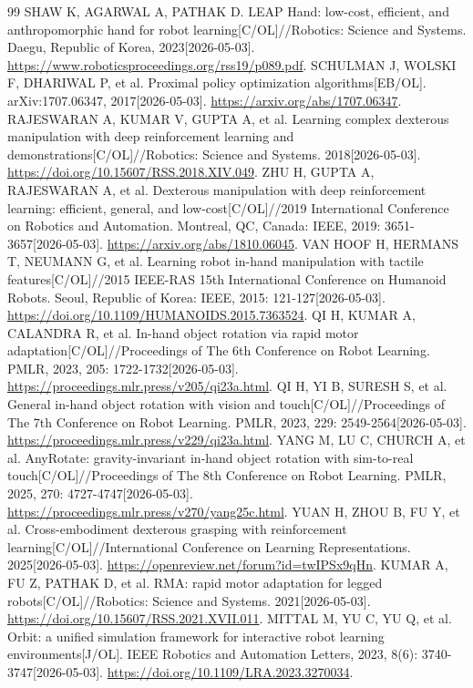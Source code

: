 \begin{thebibliography}{99}
 SHAW K, AGARWAL A, PATHAK D. LEAP Hand: low-cost, efficient, and anthropomorphic hand for robot learning[C/OL]//Robotics: Science and Systems. Daegu, Republic of Korea, 2023[2026-05-03]. \url{https://www.roboticsproceedings.org/rss19/p089.pdf}.
 SCHULMAN J, WOLSKI F, DHARIWAL P, et al. Proximal policy optimization algorithms[EB/OL]. arXiv:1707.06347, 2017[2026-05-03]. \url{https://arxiv.org/abs/1707.06347}.
 RAJESWARAN A, KUMAR V, GUPTA A, et al. Learning complex dexterous manipulation with deep reinforcement learning and demonstrations[C/OL]//Robotics: Science and Systems. 2018[2026-05-03]. \url{https://doi.org/10.15607/RSS.2018.XIV.049}.
 ZHU H, GUPTA A, RAJESWARAN A, et al. Dexterous manipulation with deep reinforcement learning: efficient, general, and low-cost[C/OL]//2019 International Conference on Robotics and Automation. Montreal, QC, Canada: IEEE, 2019: 3651-3657[2026-05-03]. \url{https://arxiv.org/abs/1810.06045}.
 VAN HOOF H, HERMANS T, NEUMANN G, et al. Learning robot in-hand manipulation with tactile features[C/OL]//2015 IEEE-RAS 15th International Conference on Humanoid Robots. Seoul, Republic of Korea: IEEE, 2015: 121-127[2026-05-03]. \url{https://doi.org/10.1109/HUMANOIDS.2015.7363524}.
 QI H, KUMAR A, CALANDRA R, et al. In-hand object rotation via rapid motor adaptation[C/OL]//Proceedings of The 6th Conference on Robot Learning. PMLR, 2023, 205: 1722-1732[2026-05-03]. \url{https://proceedings.mlr.press/v205/qi23a.html}.
 QI H, YI B, SURESH S, et al. General in-hand object rotation with vision and touch[C/OL]//Proceedings of The 7th Conference on Robot Learning. PMLR, 2023, 229: 2549-2564[2026-05-03]. \url{https://proceedings.mlr.press/v229/qi23a.html}.
 YANG M, LU C, CHURCH A, et al. AnyRotate: gravity-invariant in-hand object rotation with sim-to-real touch[C/OL]//Proceedings of The 8th Conference on Robot Learning. PMLR, 2025, 270: 4727-4747[2026-05-03]. \url{https://proceedings.mlr.press/v270/yang25c.html}.
 YUAN H, ZHOU B, FU Y, et al. Cross-embodiment dexterous grasping with reinforcement learning[C/OL]//International Conference on Learning Representations. 2025[2026-05-03]. \url{https://openreview.net/forum?id=twIPSx9qHn}.
 KUMAR A, FU Z, PATHAK D, et al. RMA: rapid motor adaptation for legged robots[C/OL]//Robotics: Science and Systems. 2021[2026-05-03]. \url{https://doi.org/10.15607/RSS.2021.XVII.011}.
 MITTAL M, YU C, YU Q, et al. Orbit: a unified simulation framework for interactive robot learning environments[J/OL]. IEEE Robotics and Automation Letters, 2023, 8(6): 3740-3747[2026-05-03]. \url{https://doi.org/10.1109/LRA.2023.3270034}.
\end{thebibliography}
